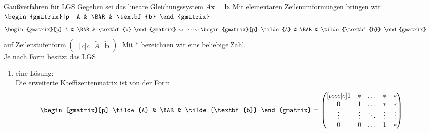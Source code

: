 \begin{mybox}{Gaußverfahren für LGS}
Gegeben sei das lineare Gleichungssystem $A \textbf{x} = \textbf{b}$.
Mit elementaren Zeilenumformungen bringen wir $\begin{gmatrix}[p] A & \BAR & \textbf{b} \end{gmatrix}$
\begin{align*}
\begin{gmatrix}[p]
A & \BAR & \textbf{b}
\end{gmatrix}
\leadsto
\dots
\leadsto
\begin{gmatrix}[p]
\tilde{A} & \BAR & \tilde{\textbf{b}}
\end{gmatrix}
\end{align*}
auf Zeilenstufenform $\begin{pmatrix}[c|c] \tilde{A} &  \tilde{\textbf{b}}\end{pmatrix}.$
Mit $\ast$ bezeichnen wir eine beliebige Zahl.\\
Je nach Form besitzt das LGS
\renewcommand{\labelenumi}{\theenumi.}
\begin{enumerate}
\item eine Lösung:\\
Die erweiterte Koeffizentenmatrix ist von der Form
\begin{align*}
\begin{gmatrix}[p]
\tilde{A} & \BAR & \tilde{\textbf{b}}
\end{gmatrix}
=
\begin{pmatrix}	[cccc|c]
1 &  \ast  & \ldots & \ast & \ast\\
0  &  1 & \ldots & \ast & \ast\\
\vdots & \vdots & \ddots & \vdots & \vdots\\
0  &   0       &\ldots & 1& \ast
\end{pmatrix}
\end{align*}


\end{enumerate}
\end{mybox}
